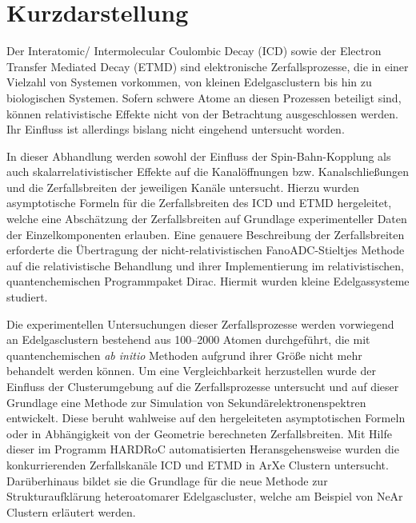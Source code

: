 \chapter*{Kurzdarstellung}
\thispagestyle{empty}

Der Interatomic/ Intermolecular Coulombic Decay (ICD) sowie der
Electron Transfer Mediated Decay (ETMD) sind elektronische Zerfallsprozesse,
die in einer Vielzahl von Systemen vorkommen, von kleinen
Edelgasclustern bis hin zu biologischen Systemen. Sofern schwere Atome
an diesen Prozessen beteiligt sind, können relativistische Effekte
nicht von der Betrachtung ausgeschlossen werden. Ihr Einfluss ist allerdings
bislang nicht eingehend untersucht worden.

In dieser Abhandlung werden sowohl der Einfluss der Spin-Bahn-Kopplung
als auch skalarrelativistischer Effekte auf die Kanalöffnungen bzw.
Kanalschließungen und die Zerfallsbreiten der jeweiligen Kanäle untersucht.
Hierzu wurden asymptotische Formeln für die Zerfallsbreiten des ICD und ETMD
hergeleitet, welche eine Abschätzung der Zerfallsbreiten auf Grundlage
experimenteller Daten der Einzelkomponenten erlauben.
Eine genauere Beschreibung der Zerfallsbreiten erforderte die Übertragung
der nicht-relativistischen FanoADC-Stieltjes Methode auf die relativistische
Behandlung und ihrer Implementierung im relativistischen, quantenchemischen
Programmpaket Dirac. Hiermit wurden kleine Edelgassysteme studiert.

Die experimentellen Untersuchungen dieser Zerfallsprozesse werden vorwiegend an
Edelgasclustern bestehend aus 100--2000 Atomen durchgeführt, die mit
quantenchemischen \emph{ab initio} Methoden aufgrund ihrer Größe
nicht mehr behandelt werden können.
Um eine Vergleichbarkeit herzustellen wurde der Einfluss der Clusterumgebung
auf die Zerfallsprozesse untersucht und auf dieser Grundlage eine
Methode zur Simulation von Sekundärelektronenspektren entwickelt. Diese
beruht wahlweise auf den hergeleiteten asymptotischen Formeln oder
in Abhängigkeit von der Geometrie berechneten Zerfallsbreiten. Mit Hilfe dieser
im Programm HARDRoC automatisierten Heransgehensweise wurden die konkurrierenden
Zerfallskanäle ICD und ETMD in ArXe Clustern untersucht. Darüberhinaus
bildet sie die Grundlage für die neue Methode zur Strukturaufklärung
heteroatomarer Edelgascluster, welche am Beispiel von NeAr Clustern
erläutert werden.

